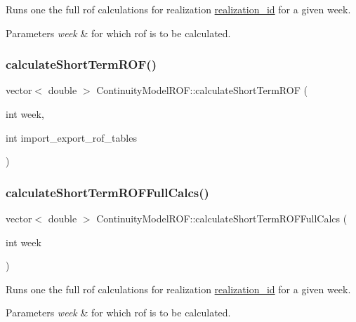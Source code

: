 Runs one the full rof calculations for realization \mbox{\hyperlink{classContinuityModel_a7b6c99bf256f6c6b633ebb78282f43c7}{realization\+\_\+id}} for a given week. 
\begin{DoxyParams}{Parameters}
{\em week} & for which rof is to be calculated. \\
\hline
\end{DoxyParams}
\mbox{\label{classContinuityModelROF_a927597ce427aa9a9f65719bccbfba623}} 
\subsubsection{\texorpdfstring{calculate\+Short\+Term\+R\+O\+F()}{calculateShortTermROF()}}
{\footnotesize\ttfamily vector$<$ double $>$ Continuity\+Model\+R\+O\+F\+::calculate\+Short\+Term\+R\+OF (\begin{DoxyParamCaption}\item[{int}]{week,  }\item[{int}]{import\+\_\+export\+\_\+rof\+\_\+tables }\end{DoxyParamCaption})}

\mbox{\label{classContinuityModelROF_afcf6c32935729d64dc2fdc021241c5e9}} 
\subsubsection{\texorpdfstring{calculate\+Short\+Term\+R\+O\+F\+Full\+Calcs()}{calculateShortTermROFFullCalcs()}}
{\footnotesize\ttfamily vector$<$ double $>$ Continuity\+Model\+R\+O\+F\+::calculate\+Short\+Term\+R\+O\+F\+Full\+Calcs (\begin{DoxyParamCaption}\item[{int}]{week }\end{DoxyParamCaption})}

Runs one the full rof calculations for realization \mbox{\hyperlink{classContinuityModel_a7b6c99bf256f6c6b633ebb78282f43c7}{realization\+\_\+id}} for a given week. 
\begin{DoxyParams}{Parameters}
{\em week} & for which rof is to be calculated. \\
\hline
\end{DoxyParams}
\mbox{\label{classContinuityModelROF_acd0dd0324718521f49eb344dbba6684d}} 
